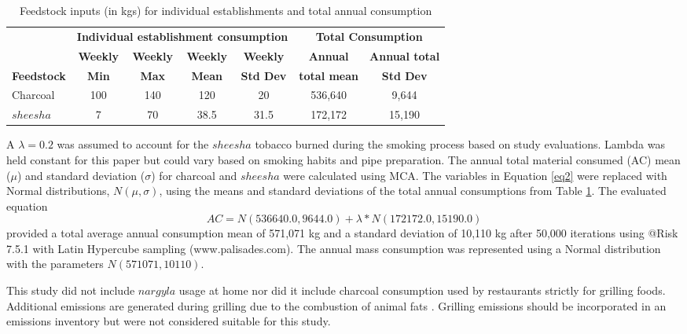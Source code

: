 %
\begin{table}[]
\centering
\caption{Feedstock inputs (in kgs) for individual establishments and total annual consumption}
\label{tb3:feedstock}
\begin{tabular}{@{}lcccccc@{}}
\toprule
 & \multicolumn{4}{c}{\textbf{Individual establishment consumption}} & \multicolumn{2}{c}{\textbf{Total Consumption}} \\ 
\textbf & \textbf{Weekly} & \textbf{Weekly} & \textbf{Weekly} & \textbf{Weekly} & \textbf{Annual} & \textbf{Annual total} \\ 
\textbf{Feedstock} & \textbf{Min} & \textbf{Max} & \textbf{Mean} & \textbf{Std Dev} & \textbf{total mean} & \textbf{Std Dev} \\ \midrule
Charcoal & 100 & 140 & 120 & 20 & 536,640 & 9,644 \\
$sheesha$ & 7 & 70 & 38.5 & 31.5 & 172,172 & 15,190 \\ \bottomrule
\end{tabular}
\end{table}
%

A $\lambda = 0.2$ was assumed to account for the $sheesha$ tobacco burned during the smoking process based on study evaluations.  Lambda was held constant for this paper but could vary based on smoking habits and pipe preparation.  The annual total material consumed (AC) mean ($\mu$) and standard deviation ($\sigma$) for charcoal and $sheesha$ were calculated using MCA.  The variables in Equation \ref{eq2} were replaced with Normal distributions, $N(\mu,\sigma)$,  using the means and standard deviations of the total annual consumptions from Table \ref{tb3:feedstock}.  The evaluated equation			
%
\begin{equation}
\label{eq7}
AC = N(536640.0,  9644.0) + \lambda*N(172172.0, 15190.0)
\end{equation}
%
\noindent
provided a total average annual consumption mean of 571,071 kg and a standard deviation of 10,110 kg after 50,000 iterations using @Risk 7.5.1 with Latin Hypercube sampling (www.palisades.com).  The annual mass consumption was represented using a Normal distribution with the parameters $N(571071, 10110)$.

This study did not include $nargyla$ usage at home nor did it include charcoal consumption used by restaurants strictly for grilling foods.  Additional emissions are generated during grilling due to the combustion of animal fats \citep{McDonald2003}.  Grilling emissions should be incorporated in an emissions inventory but were not considered suitable for this study.

